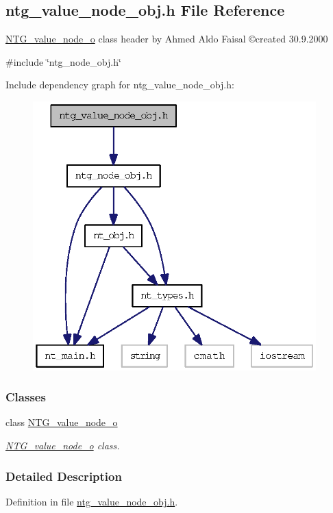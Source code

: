 \subsection{ntg\_\-value\_\-node\_\-obj.h File Reference}
\label{ntg__value__node__obj_8h}



\begin{DoxyItemize}
\item \hyperlink{class_n_t_g__value__node__o}{NTG\_\-value\_\-node\_\-o} class header by Ahmed Aldo Faisal \copyright created 30.9.2000 
\end{DoxyItemize} 


{\ttfamily \#include \char`\"{}ntg\_\-node\_\-obj.h\char`\"{}}\par
Include dependency graph for ntg\_\-value\_\-node\_\-obj.h:
\nopagebreak
\begin{figure}[H]
\begin{center}
\leavevmode
\includegraphics[width=310pt]{ntg__value__node__obj_8h__incl}
\end{center}
\end{figure}
\subsubsection*{Classes}
\begin{DoxyCompactItemize}
\item 
class \hyperlink{class_n_t_g__value__node__o}{NTG\_\-value\_\-node\_\-o}
\begin{DoxyCompactList}\small\item\em \hyperlink{class_n_t_g__value__node__o}{NTG\_\-value\_\-node\_\-o} class. \item\end{DoxyCompactList}\end{DoxyCompactItemize}


\subsubsection{Detailed Description}


Definition in file \hyperlink{ntg__value__node__obj_8h_source}{ntg\_\-value\_\-node\_\-obj.h}.

